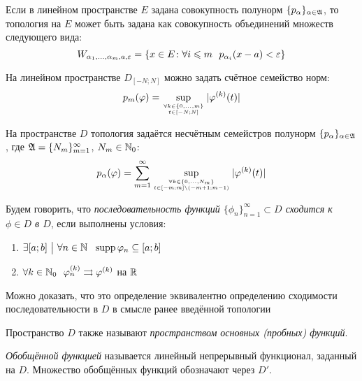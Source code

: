 \begin{proposition}
	Если в линейном пространстве $E$ задана совокупность полунорм $\{p_\alpha\}_{\alpha \in \mathfrak{A}}$, то топология на $E$ может быть задана как совокупность объединений множеств следующего вида:
	\[
		W_{\alpha_1, \ldots, \alpha_m, a, \varepsilon} = \{x \in E \colon \forall i \leqslant m\ \ p_{\alpha_i}(x - a) < \varepsilon\}
	\]
\end{proposition}

\begin{proposition}
	На линейном пространстве $D_{[-N; N]}$ можно задать счётное семейство норм:
	\[
		p_m(\varphi) = \sup_{\forall k \in \{0, \ldots, m\} \atop {t \in [-N; N]}} |\varphi^{(k)}(t)|
	\]
\end{proposition}

\begin{proposition}
	На пространстве $D$ топология задаётся несчётным семейстров полунорм $\{p_\alpha\}_{\alpha \in \mathfrak{A}}$, где $\mathfrak{A} = \{N_m\}_{m = 1}^\infty$, $N_m \in \mathbb{N}_0$:
	\[
		p_{\alpha}(\varphi) = \sum_{m = 1}^\infty \sup_{\forall k \in \{0, \ldots, N_m\} \atop {t \in [-m; m] \backslash(-m + 1; m - 1)}} |\varphi^{(k)}(t)|
	\]
\end{proposition}

\begin{definition}
	Будем говорить, что \textit{последовательность функций $\{\phi_n\}_{n = 1}^\infty \subset D$ сходится к $\phi \in D$ в $D$}, если выполнены условия:
	\begin{enumerate}
		\item $\exists [a; b] \such \forall n \in \N\ \ \supp \phi_n \subseteq [a; b]$
		
		\item $\forall k \in \mathbb{N}_0\ \ \varphi_n^{(k)} \rightrightarrows \varphi^{(k)}$ на $\mathbb{R}$
	\end{enumerate}
\end{definition}

\begin{note}
	Можно доказать, что это определение эквивалентно определению сходимости последовательности в $D$ в смысле ранее введённой топологии
\end{note}

\begin{note}
	Пространство $D$ также называют \textit{пространством основных (пробных) функций}.
\end{note}

\begin{definition}
	\textit{Обобщённой функцией} называется линейный непрерывный функционал, заданный на $D$. Множество обобщённых функций обозначают через $D'$.
\end{definition}

